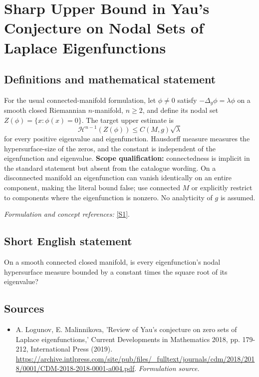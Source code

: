 \documentclass[11pt]{article}
\begin{document}
\section*{\texorpdfstring{Sharp Upper Bound in Yau's Conjecture on Nodal Sets of Laplace Eigenfunctions}{Sharp Upper Bound in Yau's Conjecture on Nodal Sets of Laplace Eigenfunctions}}\label{30006830}
\subsection{Definitions and mathematical statement}
For the usual connected-manifold formulation, let $\phi\ne0$ satisfy
$-\Delta_g\phi=\lambda\phi$ on a smooth closed Riemannian $n$-manifold, $n\ge2$, and define its nodal set $Z(\phi)=\{x:\phi(x)=0\}$. The target upper estimate is
\[
 \mathcal H^{n-1}(Z(\phi))\le C(M,g)\sqrt\lambda
\]
for every positive eigenvalue and eigenfunction. Hausdorff measure measures the hypersurface-size of the zeros, and the constant is independent of the eigenfunction and eigenvalue. \textbf{Scope qualification:} connectedness is implicit in the standard statement but absent from the catalogue wording. On a disconnected manifold an eigenfunction can vanish identically on an entire component, making the literal bound false; use connected $M$ or explicitly restrict to components where the eigenfunction is nonzero. No analyticity of $g$ is assumed.
\par\smallskip\textit{Formulation and concept references:} \href{https://archive.intlpress.com/site/pub/files/_fulltext/journals/cdm/2018/2018/0001/CDM-2018-2018-0001-a004.pdf}{[S1]}.

\subsection{Short English statement}
On a smooth connected closed manifold, is every eigenfunction's nodal hypersurface measure bounded by a constant times the square root of its eigenvalue?
\subsection{Sources}
\begin{itemize}
\item[S1]A. Logunov, E. Malinnikova, 'Review of Yau's conjecture on zero sets of Laplace eigenfunctions,' Current Developments in Mathematics 2018, pp. 179-212, International Press (2019).
\url{https://archive.intlpress.com/site/pub/files/_fulltext/journals/cdm/2018/2018/0001/CDM-2018-2018-0001-a004.pdf}.
\textit{Formulation source.}
\end{itemize}
\end{document}
